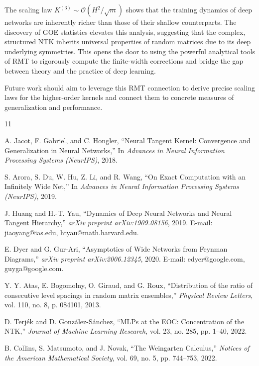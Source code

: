 \documentclass{article}
\newcommand{\Order}{\mathcal{O}}
\begin{document}
The scaling law $K^{(3)} \sim \Order(H^2/\sqrt{m})$ shows that the training dynamics of deep networks are inherently richer than those of their shallow counterparts. The discovery of GOE statistics elevates this analysis, suggesting that the complex, structured NTK inherits universal properties of random matrices due to its deep underlying symmetries. This opens the door to using the powerful analytical tools of RMT to rigorously compute the finite-width corrections and bridge the gap between theory and the practice of deep learning.

Future work should aim to leverage this RMT connection to derive precise scaling laws for the higher-order kernels and connect them to concrete measures of generalization and performance.

\newpage

\begin{thebibliography}{11}

    A. Jacot, F. Gabriel, and C. Hongler,
    \newblock ``Neural Tangent Kernel: Convergence and Generalization in Neural Networks,''
    \newblock In \emph{Advances in Neural Information Processing Systems (NeurIPS)}, 2018.
    
    S. Arora, S. Du, W. Hu, Z. Li, and R. Wang,
    \newblock ``On Exact Computation with an Infinitely Wide Net,''
    \newblock In \emph{Advances in Neural Information Processing Systems (NeurIPS)}, 2019.
    
    J. Huang and H.-T. Yau,
    \newblock ``Dynamics of Deep Neural Networks and Neural Tangent Hierarchy,''
    \newblock \emph{arXiv preprint arXiv:1909.08156}, 2019.
    \newblock E-mail: jiaoyang@ias.edu, htyau@math.harvard.edu.
    
    E. Dyer and G. Gur-Ari,
    \newblock ``Asymptotics of Wide Networks from Feynman Diagrams,''
    \newblock \emph{arXiv preprint arXiv:2006.12345}, 2020.
    \newblock E-mail: edyer@google.com, guyga@google.com.
    
    Y. Y. Atas, E. Bogomolny, O. Giraud, and G. Roux,
    \newblock ``Distribution of the ratio of consecutive level spacings in random matrix ensembles,''
    \newblock \emph{Physical Review Letters}, vol. 110, no. 8, p. 084101, 2013.

    D. Terj\'ek and D. Gonz\'alez-S\'anchez,
    \newblock ``MLPs at the EOC: Concentration of the NTK,''
    \newblock \emph{Journal of Machine Learning Research}, vol. 23, no. 285, pp. 1--40, 2022.

    B. Collins, S. Matsumoto, and J. Novak,
    \newblock ``The Weingarten Calculus,''
    \newblock \emph{Notices of the American Mathematical Society}, vol. 69, no. 5, pp. 744--753, 2022.
    
    \end{thebibliography}
\end{document}
